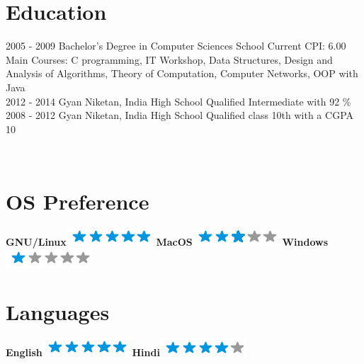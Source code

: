 \documentclass[]{friggeri-cv}
\begin{document}
\section{Education}
\begin{entrylist}
  \entry
    {2005 - 2009}
    {Bachelor's Degree in Computer Sciences}
    {School}
    {Current CPI: 6.00 \\Main Courses: C programming, IT Workshop, Data Structures, Design and Analysis of Algorithms, Theory of Computation, Computer Networks, OOP with Java\\}
  \entry
    {2012 - 2014}
    {Gyan Niketan, India}
    {High School}
    {Qualified Intermediate with 92 \% \\}
  \entry
    {2008 - 2012}
    {Gyan Niketan, India}
    {High School}
    {Qualified class 10th with a CGPA 10}
\end{entrylist}

\newpage

\begin{aside}
~
~
~
  \section{OS Preference}
    \textbf{GNU/Linux}\includegraphics[scale=0.40]{img/5stars.png}
    \textbf{MacOS}\includegraphics[scale=0.40]{img/3stars.png}
    \textbf{Windows}\includegraphics[scale=0.40]{img/1stars.png}
    ~
  \section{Languages}
    \textbf{English}\includegraphics[scale=0.40]{img/5stars.png}
    \textbf{Hindi}\includegraphics[scale=0.40]{img/4stars.png}
    ~
\end{aside}
\end{document}
